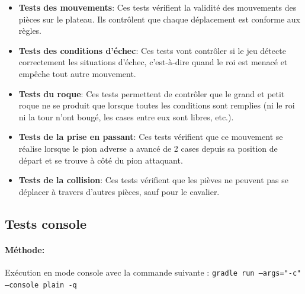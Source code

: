 \documentclass[12pt]{article}
\begin{document}
\begin{itemize}
    \item \textbf{Tests des mouvements}: Ces tests vérifient la validité des mouvements des pièces sur le plateau. Ils contrôlent que chaque déplacement est conforme aux règles.
    \item \textbf{Tests des conditions d'échec}: Ces tests vont contrôler si le jeu détecte correctement les situations d'échec, c'est-à-dire quand le roi est menacé et empêche tout autre mouvement.
    \item \textbf{Tests du roque}: Ces tests permettent de contrôler que le grand et petit roque ne se produit que lorsque toutes les conditions sont remplies (ni le roi ni la tour n'ont bougé, les cases entre eux sont libres, etc.).
    \item \textbf{Tests de la prise en passant}: Ces tests vérifient que ce mouvement se réalise lorsque le pion adverse a avancé de 2 cases depuis sa position de départ et se trouve à côté du pion attaquant.
    \item \textbf{Tests de la collision}: Ces tests vérifient que les pièves ne peuvent pas se déplacer à travers d'autres pièces, sauf pour le cavalier.

\end{itemize}

\subsection{Tests console}
\paragraph{Méthode:}
Exécution en mode console avec la commande suivante :
\texttt{gradle run --args="-c" --console plain -q}
\\
\end{document}
